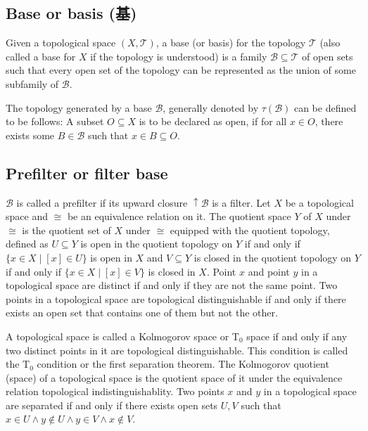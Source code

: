 \documentclass[a4paper,12pt]{article}
\begin{document}
\subsection{Base or basis (基)}
Given a topological space $(X,\mathcal{T})$, a base (or basis) for the topology $\mathcal{T}$ (also called a base for $X$ if the topology is understood) is a family $\mathcal{B}\subseteq\mathcal{T}$ of open sets such that every open set of the topology can be represented as the union of some subfamily of $\mathcal{B}$.

The topology generated by a base $\mathcal{B}$, generally denoted by $\tau(\mathcal{B})$ can be defined to be follows: A subset $O\subseteq X$ is to be declared as open, if for all $x\in O$, there exists some $B\in\mathcal{B}$ such that $x\in B\subseteq O$.
\subsection{Prefilter or filter base}
$\mathcal{B}$ is called a prefilter if its upward closure $\uparrow\mathcal{B}$ is a filter.
Let $X$ be a topological space and $\cong$ be an equivalence relation on it. The quotient space $Y$ of $X$ under $\cong$ is the quotient set of $X$ under $\cong$ equipped with the quotient topology, defined as $U\subseteq Y$ is open in the quotient topology on $Y$ if and only if $\{x\in X\mid[x]\in U\}$ is open in $X$ and $V\subseteq Y$ is closed in the quotient topology on $Y$ if and only if $\{x\in X\mid[x]\in V\}$ is closed in $X$.
Point $x$ and point $y$ in a topological space are distinct if and only if they are not the same point.
Two points in a topological space are topological distinguishable if and only if there exists an open set that contains one of them but not the other.

A topological space is called a Kolmogorov space or T$_0$ space if and only if any two distinct points in it are topological distinguishable. This condition is called the T$_0$ condition or the first separation theorem.
The Kolmogorov quotient (space) of a topological space is the quotient space of it under the equivalence relation topological indistinguishablity.
Two points $x$ and $y$ in a topological space are separated if and only if there exists open sets $U,V$ such that $x\in U\land y\notin U\land y\in V\land x\notin V$.
\end{document}
